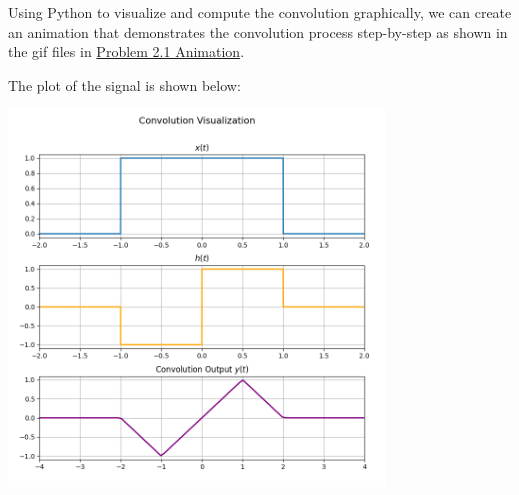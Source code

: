 \documentclass[a4paper, 10pt]{article}
\begin{document}
\begin{tosubmit}
\begin{subproblems}[start=1]
    \item \submitsolution
\end{subproblems}

Using Python to visualize and compute the convolution graphically,
we can create an animation that demonstrates the convolution process step-by-step
as shown in the gif files in \href{https://github.com/patthadon-p/CEDT-2110203-CEM-II/blob/main/signal/homework-2/images/problem_2_1.gif}{Problem 2.1 Animation}.

\vspace{3mm}

The plot of the signal is shown below:
\begin{center}
    \includegraphics[width=0.75\textwidth]{images/problem_2_1_snapshot.png}
\end{center}
\end{tosubmit}

\newpage 

\begin{subproblems}[start=2]
    \item
\end{subproblems}
\end{document}
